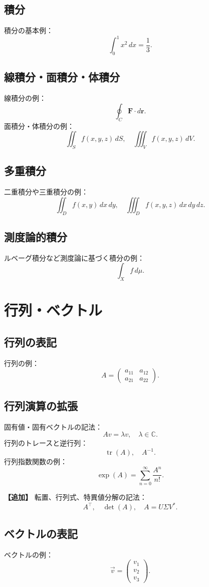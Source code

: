 \documentclass{ltjsarticle} %
\begin{document}
\subsection{積分}
積分の基本例：
\[
  \int_{0}^{1} x^2\,dx = \frac{1}{3}.
\]

\subsection{線積分・面積分・体積分}
線積分の例：
\[
  \oint_C \mathbf{F}\cdot d\mathbf{r}.
\]
面積分・体積分の例：
\[
  \iint_S f(x,y,z)\,dS, \quad \iiint_V f(x,y,z)\,dV.
\]

\subsection{多重積分}
二重積分や三重積分の例：
\[
  \iint_D f(x,y)\,dx\,dy, \quad \iiint_D f(x,y,z)\,dx\,dy\,dz.
\]

\subsection{測度論的積分}
ルベーグ積分など測度論に基づく積分の例：
\[
  \int_X f\,d\mu.
\]

\section{行列・ベクトル}
\subsection{行列の表記}
行列の例：
\[
  A = \begin{pmatrix}
    a_{11} & a_{12} \\
    a_{21} & a_{22}
  \end{pmatrix}.
\]

\subsection{行列演算の拡張}
固有値・固有ベクトルの記法：
\[
  Av = \lambda v,\quad \lambda \in \mathbb{C}.
\]
行列のトレースと逆行列：
\[
  \operatorname{tr}(A), \quad A^{-1}.
\]
行列指数関数の例：
\[
  \exp(A) = \sum_{n=0}^{\infty} \frac{A^n}{n!}.
\]
\medskip

\noindent\textbf{【追加】}  
転置、行列式、特異値分解の記法：
\[
  A^\top,\quad \det(A),\quad A = U\Sigma V^\ast.
\]

\subsection{ベクトルの表記}
ベクトルの例：
\[
  \vec{v} = \begin{pmatrix} v_1 \\ v_2 \\ v_3 \end{pmatrix}.
\]
\end{document}
